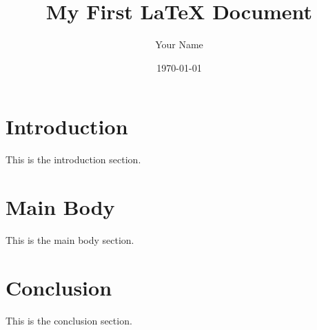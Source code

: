 \documentclass{article}
\begin{document}
\title{My First LaTeX Document}
\author{Your Name}
\date{\today}
\maketitle

\section{Introduction}

This is the introduction section.

\section{Main Body}

This is the main body section.

\section{Conclusion}

This is the conclusion section.
\end{document}
